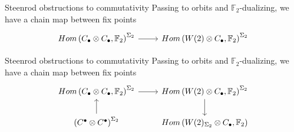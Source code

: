 \documentclass[10pt,t]{beamer}
\newcommand{\F}{\mathbb F}
\begin{document}
	

\begin{frame}[fragile]{Steenrod obstructions to commutativity}
	Passing to orbits and $\F_2$-dualizing, we have a chain map between fix points
	\begin{equation*}
	\begin{tikzcd}
	Hom\left(C_\bullet \otimes C_\bullet, \F_2 \right)^{\Sigma_2} \arrow[r] &
	Hom\left(W(2) \otimes C_\bullet, \F_2 \right)^{\Sigma_2}
	\end{tikzcd}
	\end{equation*}
\end{frame}
\begin{frame}[fragile]{Steenrod obstructions to commutativity}
	Passing to orbits and $\F_2$-dualizing, we have a chain map between fix points
	\begin{equation*}
	\begin{tikzcd}
	Hom\left(C_\bullet \otimes C_\bullet, \F_2 \right)^{\Sigma_2} \arrow[r] &
	Hom\left(W(2) \otimes C_\bullet, \F_2 \right)^{\Sigma_2} \arrow[d] \\
	\left(C^\bullet \otimes C^\bullet\right)^{\Sigma_2} \arrow[u] &
	Hom\left(W(2)_{\Sigma_2} \otimes C_\bullet, \F_2 \right)
	\end{tikzcd}
	\end{equation*}
\end{frame}
\end{document}
